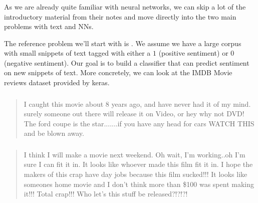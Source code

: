 \documentclass[xetex,mathserif,serif,aspectratio=169]{beamer}
\begin{document}
\begin{frame}[fragile] \frametitle{} \oldB \small


As we are already quite familiar with neural networks, we can skip a lot
of the introductory material from their notes and move directly into
the two main problems with text and NNs.

The reference problem we'll start with is . We
assume we have a large corpus with small snippets of text tagged with
either a $1$ (positive sentiment) or $0$ (negative sentiment). Our goal
is to build a classifier that can predict sentiment on new snippets of
text. More concretely, we can look at the IMDB Movie reviews dataset
provided by keras.

\end{frame}

\begin{frame}[fragile] \frametitle{} \oldB

\begin{quote}
I caught this movie about 8 years ago, and have never had it of my mind. surely someone out there will release it on Video, or hey why not DVD! The ford coupe is the star.......if you have any head for cars WATCH THIS and be blown away.
\end{quote}

\end{frame}

\begin{frame}[fragile] \frametitle{} \oldB

\begin{quote}
I think I will make a movie next weekend. Oh wait, I'm working..oh I'm sure I can fit it in. It looks like whoever made this film fit it in. I hope the makers of this crap have day jobs because this film sucked!!! It looks like someones home movie and I don't think more than \$100 was spent making it!!! Total crap!!! Who let's this stuff be released?!?!?!
\end{quote}

\end{frame}
\end{document}
